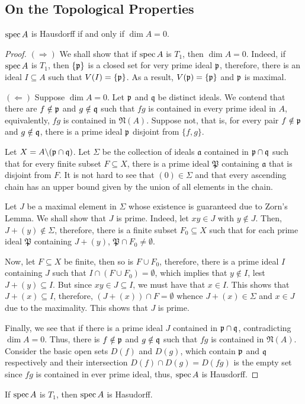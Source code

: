 \subsection{On the Topological Properties}
\begin{proposition}
    $\operatorname{spec} A$ is Hausdorff if and only if $\dim A = 0$.
\end{proposition}
\begin{proof} 
$(\Longrightarrow)$ We shall show that if $\operatorname{spec} A$ is $T_1$, then $\dim A = 0$. Indeed, if $\operatorname{spec} A$ is $T_1$, then $\{\mathfrak p\}$ is a closed set for very prime ideal $\mathfrak p$, therefore, there is an ideal $I\subseteq A$ such that $V(I) = \{\mathfrak p\}$. As a result, $V(\mathfrak p) = \{\mathfrak p\}$ and $\mathfrak p$ is maximal.

$(\Longleftarrow)$ Suppose $\dim A = 0$. Let $\mathfrak p$ and $\mathfrak q$ be distinct ideals. We contend that there are $f\notin\mathfrak p$ and $g\notin\mathfrak q$ such that $fg$ is contained in every prime ideal in $A$, equivalently, $fg$ is contained in $\mathfrak N(A)$. Suppose not, that is, for every pair $f\notin\mathfrak p$ and $g\notin\mathfrak q$, there is a prime ideal $\mathfrak p$ disjoint from $\{f,g\}$.

Let $X = A\backslash(\mathfrak p\cap\mathfrak q)$. Let $\Sigma$ be the collection of ideals $\mathfrak a$ contained in $\mathfrak p\cap\mathfrak q$ such that for every finite subset $F\subseteq X$, there is a prime ideal $\mathfrak P$ containing $\mathfrak a$ that is disjoint from $F$. It is not hard to see that $(0)\in\Sigma$ and that every ascending chain has an upper bound given by the union of all elements in the chain.

Let $J$ be a maximal element in $\Sigma$ whose existence is guaranteed due to Zorn's Lemma. We shall show that $J$ is prime. Indeed, let $xy\in J$ with $y\notin J$. Then, $J + (y)\notin\Sigma$, therefore, there is a finite subset $F_0\subseteq X$ such that for each prime ideal $\mathfrak P$ containing $J + (y)$, $\mathfrak P\cap F_0\ne\emptyset$.

Now, let $F\subseteq X$ be finite, then so is $F\cup F_0$, therefore, there is a prime ideal $I$ containing $J$ such that $I\cap(F\cup F_0) = \emptyset$, which implies that $y\notin I$, lest $J + (y)\subseteq I$. But since $xy\in J\subseteq I$, we must have that $x\in I$. This shows that $J + (x)\subseteq I$, therefore, $(J + (x))\cap F = \emptyset$ whence $J + (x)\in\Sigma$ and $x\in J$ due to the maximality. This shows that $J$ is prime.

Finally, we see that if there is a prime ideal $J$ contained in $\mathfrak p\cap\mathfrak q$, contradicting $\dim A = 0$. Thus, there is $f\notin\mathfrak p$ and $g\notin\mathfrak q$ such that $fg$ is contained in $\mathfrak N(A)$. Consider the basic open sets $D(f)$ and $D(g)$, which contain $\mathfrak p$ and $\mathfrak q$ respectively and their intersection $D(f)\cap D(g) = D(fg)$ is the empty set since $fg$ is contained in ever prime ideal, thus, $\operatorname{spec} A$ is Hausdorff.
\end{proof}

\begin{corollary}
    If $\operatorname{spec} A$ is $T_1$, then $\operatorname{spec} A$ is Hasudorff.
\end{corollary}

